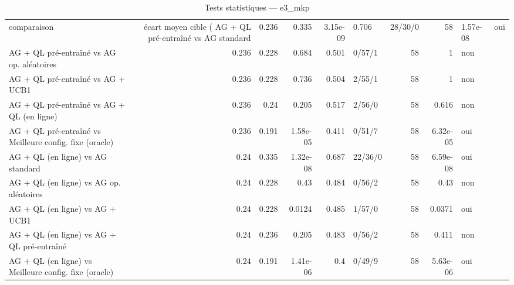 \begin{table}
\caption{Tests statistiques — e3_mkp}
\label{tab:tests-e3_mkp}
\begin{tabular}{lrrrrlrrl}
\toprule
comparaison & écart moyen cible (%
\midrule
AG + QL pré-entraîné vs AG standard & 0.236 & 0.335 & 3.15e-09 & 0.706 & 28/30/0 & 58 & 1.57e-08 & oui \\
AG + QL pré-entraîné vs AG op. aléatoires & 0.236 & 0.228 & 0.684 & 0.501 & 0/57/1 & 58 & 1 & non \\
AG + QL pré-entraîné vs AG + UCB1 & 0.236 & 0.228 & 0.736 & 0.504 & 2/55/1 & 58 & 1 & non \\
AG + QL pré-entraîné vs AG + QL (en ligne) & 0.236 & 0.24 & 0.205 & 0.517 & 2/56/0 & 58 & 0.616 & non \\
AG + QL pré-entraîné vs Meilleure config. fixe (oracle) & 0.236 & 0.191 & 1.58e-05 & 0.411 & 0/51/7 & 58 & 6.32e-05 & oui \\
AG + QL (en ligne) vs AG standard & 0.24 & 0.335 & 1.32e-08 & 0.687 & 22/36/0 & 58 & 6.59e-08 & oui \\
AG + QL (en ligne) vs AG op. aléatoires & 0.24 & 0.228 & 0.43 & 0.484 & 0/56/2 & 58 & 0.43 & non \\
AG + QL (en ligne) vs AG + UCB1 & 0.24 & 0.228 & 0.0124 & 0.485 & 1/57/0 & 58 & 0.0371 & oui \\
AG + QL (en ligne) vs AG + QL pré-entraîné & 0.24 & 0.236 & 0.205 & 0.483 & 0/56/2 & 58 & 0.411 & non \\
AG + QL (en ligne) vs Meilleure config. fixe (oracle) & 0.24 & 0.191 & 1.41e-06 & 0.4 & 0/49/9 & 58 & 5.63e-06 & oui \\
\bottomrule
\end{tabular}
\end{table}
